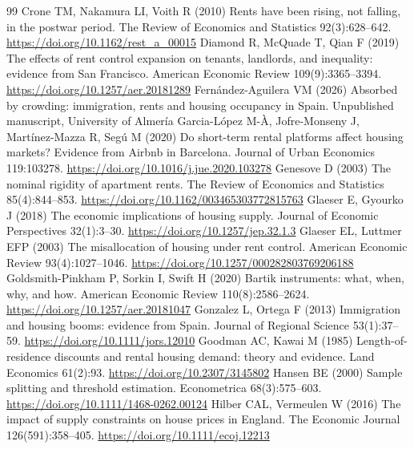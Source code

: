 \begin{thebibliography}{99}
 Crone TM, Nakamura LI, Voith R (2010) Rents have been rising, not falling, in the postwar period. The Review of Economics and Statistics 92(3):628--642. \url{https://doi.org/10.1162/rest_a_00015}
 Diamond R, McQuade T, Qian F (2019) The effects of rent control expansion on tenants, landlords, and inequality: evidence from San Francisco. American Economic Review 109(9):3365--3394. \url{https://doi.org/10.1257/aer.20181289}
 Fernández-Aguilera VM (2026) Absorbed by crowding: immigration, rents and housing occupancy in Spain. Unpublished manuscript, University of Almería
 Garcia-López M-À, Jofre-Monseny J, Martínez-Mazza R, Segú M (2020) Do short-term rental platforms affect housing markets? Evidence from Airbnb in Barcelona. Journal of Urban Economics 119:103278. \url{https://doi.org/10.1016/j.jue.2020.103278}
 Genesove D (2003) The nominal rigidity of apartment rents. The Review of Economics and Statistics 85(4):844--853. \url{https://doi.org/10.1162/003465303772815763}
 Glaeser E, Gyourko J (2018) The economic implications of housing supply. Journal of Economic Perspectives 32(1):3--30. \url{https://doi.org/10.1257/jep.32.1.3}
 Glaeser EL, Luttmer EFP (2003) The misallocation of housing under rent control. American Economic Review 93(4):1027--1046. \url{https://doi.org/10.1257/000282803769206188}
 Goldsmith-Pinkham P, Sorkin I, Swift H (2020) Bartik instruments: what, when, why, and how. American Economic Review 110(8):2586--2624. \url{https://doi.org/10.1257/aer.20181047}
 Gonzalez L, Ortega F (2013) Immigration and housing booms: evidence from Spain. Journal of Regional Science 53(1):37--59. \url{https://doi.org/10.1111/jors.12010}
 Goodman AC, Kawai M (1985) Length-of-residence discounts and rental housing demand: theory and evidence. Land Economics 61(2):93. \url{https://doi.org/10.2307/3145802}
 Hansen BE (2000) Sample splitting and threshold estimation. Econometrica 68(3):575--603. \url{https://doi.org/10.1111/1468-0262.00124}
 Hilber CAL, Vermeulen W (2016) The impact of supply constraints on house prices in England. The Economic Journal 126(591):358--405. \url{https://doi.org/10.1111/ecoj.12213}

\end{thebibliography}

